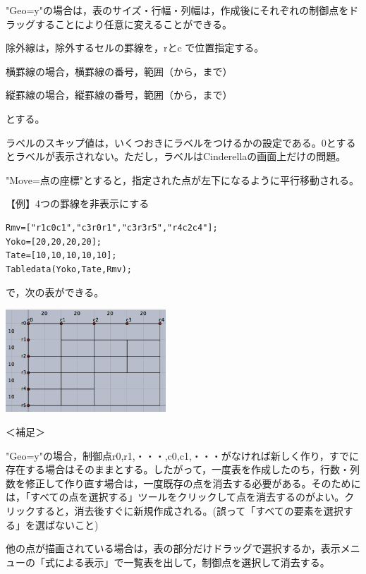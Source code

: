 \documentclass[papersize,a4paper,12pt,uplatex]{jsarticle}
\begin{document}
\begin{description}
"Geo=y"の場合は，表のサイズ・行幅・列幅は，作成後にそれぞれの制御点をドラッグすることにより任意に変えることができる。

\vspace{\baselineskip}
除外線は，除外するセルの罫線を，rとc で位置指定する。

\hspace{10mm} 横罫線の場合，横罫線の番号，範囲（から，まで）

\hspace{10mm} 縦罫線の場合，縦罫線の番号，範囲（から，まで）

とする。

ラベルのスキップ値は，いくつおきにラベルをつけるかの設定である。0とするとラベルが表示されない。ただし，ラベルはCinderellaの画面上だけの問題。

\vspace{\baselineskip}"Move=点の座標"とすると，指定された点が左下になるように平行移動される。


\vspace{\baselineskip}
【例】4つの罫線を非表示にする
\begin{verbatim}
Rmv=["r1c0c1","c3r0r1","c3r3r5","r4c2c4"];
Yoko=[20,20,20,20];
Tate=[10,10,10,10,10];
Tabledata(Yoko,Tate,Rmv);
\end{verbatim}

で，次の表ができる。

\vspace{\baselineskip}
\hspace{20mm}\includegraphics[bb=0 0 392.02 251.51 , width=6cm]{Fig/table03.pdf}

\vspace{\baselineskip}
＜補足＞

"Geo=y"の場合，制御点r0,r1,・・・,c0,c1,・・・がなければ新しく作り，すでに存在する場合はそのままとする。したがって，一度表を作成したのち，行数・列数を修正して作り直す場合は，一度既存の点を消去する必要がある。そのためには，「すべての点を選択する」ツールをクリックして点を消去するのがよい。クリックすると，消去後すぐに新規作成される。(誤って「すべての要素を選択する」を選ばないこと)

他の点が描画されている場合は，表の部分だけドラッグで選択するか，表示メニューの「式による表示」で一覧表を出して，制御点を選択して消去する。


\end{description}
\end{document}
